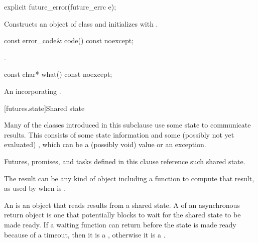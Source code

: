 %
\begin{itemdecl}
explicit future_error(future_errc e);
\end{itemdecl}

\begin{itemdescr}
\pnum
\effects Constructs an object of class 
and initializes  with .
\end{itemdescr}

%
\begin{itemdecl}
const error_code& code() const noexcept;
\end{itemdecl}

\begin{itemdescr}
\pnum
\returns {}.
\end{itemdescr}

%
\begin{itemdecl}
const char* what() const noexcept;
\end{itemdecl}

\begin{itemdescr}
\pnum
\returns An \ntbs{} incorporating .
\end{itemdescr}

[futures.state]{Shared state}

\pnum
Many of the classes introduced in this subclause use some state to communicate results. This
 consists of some state information and some (possibly not
yet evaluated) , which can be a (possibly void) value or an exception. \begin{note}
Futures, promises, and tasks defined in this clause reference such shared state. \end{note}

\pnum
\begin{note} The result can be any kind of object including a function to compute that result,
as used by  when  is . \end{note}

\pnum
An  is an object that reads results from a
shared state. A  of an asynchronous return object is one
that potentially blocks to wait for the shared state to be made
ready.
If a waiting function can return before the state is made ready because of a
timeout, then it is a , otherwise
it is a .

